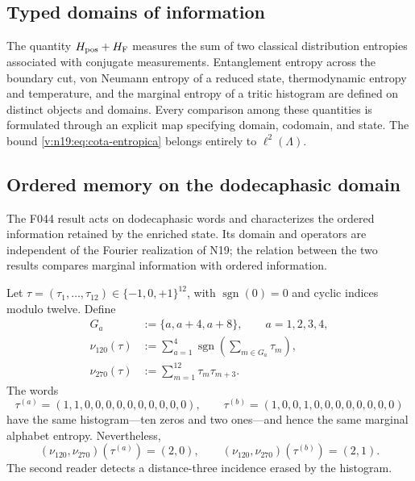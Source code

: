 \subsection{Typed domains of information}
\label{v:n19:sec:tipos-entropia}

The quantity \(H_{\rm pos}+H_{\rm F}\) measures the sum of two classical
distribution entropies associated with conjugate measurements.
Entanglement entropy across the boundary cut, von Neumann entropy of a
reduced state, thermodynamic entropy and temperature, and the marginal
entropy of a tritic histogram are defined on distinct objects and domains.
Every comparison among these quantities is formulated through an explicit
map specifying domain, codomain, and state. The bound
\eqref{v:n19:eq:cota-entropica} belongs entirely to
\(\ell^2(\Lambda)\).

\subsection{Ordered memory on the dodecaphasic domain}
\label{v:n19:sec:memoria-ordenada}

The F044 result acts on dodecaphasic words and characterizes the ordered
information retained by the enriched state. Its domain and operators are
independent of the Fourier realization of N19; the relation between the
two results compares marginal information with ordered information.

Let \(\tau=(\tau_1,\ldots,\tau_{12})\in\{-1,0,+1\}^{12}\), with
\(\operatorname{sgn}(0)=0\) and cyclic indices modulo twelve. Define
\begin{align}
 G_a&:=\{a,a+4,a+8\},\qquad a=1,2,3,4,\nonumber\\
 \nu_{120}(\tau)&:=\sum_{a=1}^4
   \operatorname{sgn}\!\left(\sum_{m\in G_a}\tau_m\right),
 \label{v:n19:eq:nu120}\\
 \nu_{270}(\tau)&:=\sum_{m=1}^{12}\tau_m\tau_{m+3}.
 \label{v:n19:eq:nu270}
\end{align}
The words
\begin{equation}
 \tau^{(a)}=(1,1,0,0,0,0,0,0,0,0,0,0),\qquad
 \tau^{(b)}=(1,0,0,1,0,0,0,0,0,0,0,0)
 \label{v:n19:eq:testigos-orden}
\end{equation}
have the same histogram---ten zeros and two ones---and hence the same
marginal alphabet entropy. Nevertheless,
\begin{equation}
 (\nu_{120},\nu_{270})(\tau^{(a)})=(2,0),\qquad
 (\nu_{120},\nu_{270})(\tau^{(b)})=(2,1).
 \label{v:n19:eq:testigos-lectura}
\end{equation}
The second reader detects a distance-three incidence erased by the
histogram.

